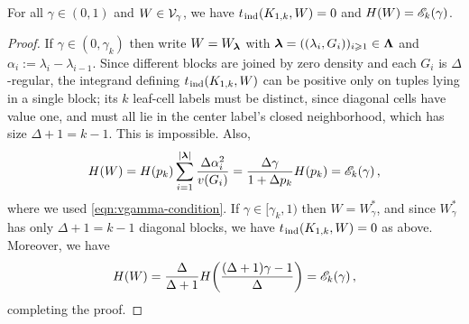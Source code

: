 \begin{lemma}\label{lemma:Vgamma-opt}
For all $\gamma\in(0,1)$ and $W\in{\mathcal V}_\gamma$, we have $t_{\hspace{0.2mm}\mathrm{ind}}(K_{1,k},W)=0$ and $H(W)={\mathscr E}_k(\gamma)$.
\end{lemma}
\begin{proof}
If $\gamma\in(0,\gamma_k)$ then write $W=W_{\boldsymbol{\lambda}}$ with ${\boldsymbol{\lambda}}=((\lambda_i,G_i))_{i\geqslant1}\in{\boldsymbol{\Lambda}}$ and $\alpha_i:=\lambda_i-\lambda_{i-1}$. Since different blocks are joined by zero density and each $G_i$ is $\Delta$-regular, the integrand defining $t_{\hspace{0.2mm}\mathrm{ind}}(K_{1,k},W)$ can be positive only on tuples lying in a single block; its $k$ leaf-cell labels must be distinct, since diagonal cells have value one, and must all lie in the center label's closed neighborhood, which has size $\Delta+1=k-1$. This is impossible. Also,
$$H(W)=H(p_k)\sum_{i=1}^{|{\boldsymbol{\lambda}}|}\frac{\Delta\alpha_i^2}{v(G_i)}=\frac{\Delta\gamma}{1+\Delta p_k}H(p_k)={\mathscr E}_k(\gamma)\,,$$
where we used \eqref{eqn:vgamma-condition}. If $\gamma\in[\gamma_k,1)$ then $W=W^\ast_\gamma$, and since $W^\ast_\gamma$ has only $\Delta+1=k-1$ diagonal blocks, we have $t_{\hspace{0.2mm}\mathrm{ind}}(K_{1,k},W)=0$ as above. Moreover, we have
$$H(W)=\frac{\Delta}{\Delta+1}H\!\left(\frac{(\Delta+1)\gamma-1}{\Delta}\right)={\mathscr E}_k(\gamma)\,,$$
completing the proof.
\end{proof}

